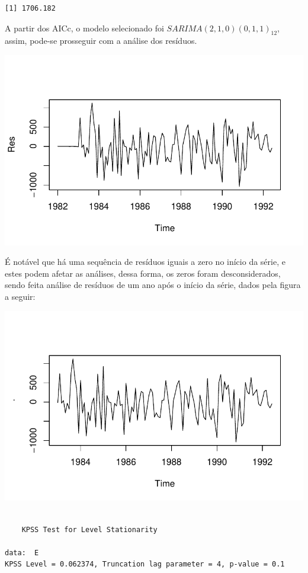 \documentclass[
  letterpaper,
  DIV=11,
  numbers=noendperiod]{scrartcl}
\begin{document}
\begin{verbatim}
[1] 1706.182
\end{verbatim}

A partir dos AICc, o modelo selecionado foi
\(SARIMA(2,1,0)(0,1,1)_{12}\), assim, pode-se prosseguir com a análise
dos resíduos.

\includegraphics{T2_grupo10_files/figure-pdf/análise de resíduos - sem box-cox-1.pdf}

É notável que há uma sequência de resíduos iguais a zero no início da
série, e estes podem afetar as análises, dessa forma, os zeros foram
desconsiderados, sendo feita análise de resíduos de um ano após o início
da série, dados pela figura a seguir:

\includegraphics{T2_grupo10_files/figure-pdf/análise de resíduos - sem box-cox e sem zeros-1.pdf}

\begin{verbatim}

    KPSS Test for Level Stationarity

data:  E
KPSS Level = 0.062374, Truncation lag parameter = 4, p-value = 0.1
\end{verbatim}
\end{document}
